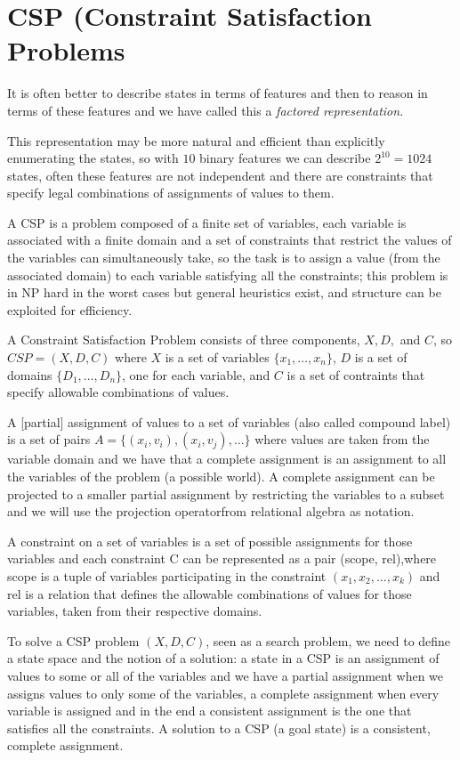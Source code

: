 \chapter{CSP (Constraint Satisfaction Problems}
It is often better to describe states in terms of features and then to reason in terms of these features and we have called this a \emph{factored representation}.

This representation may be more natural and efficient than explicitly enumerating the states, so with $10$ binary features we can describe $2^{10} = 1024$ states,
often these features are not independent and there are constraints that specify legal combinations of assignments of values to them.

A CSP is a problem composed of a finite set of variables, each variable is
associated with a finite domain and a set of constraints that restrict
the values of the variables can simultaneously take, so the task is to
assign a value (from the associated domain) to each variable 
satisfying all the constraints;
this problem is in NP hard in the worst cases but general heuristics exist, and structure can be exploited for efficiency.

A Constraint Satisfaction Problem consists of three components, $X, D,$ and $C$,
so $CSP = (X, D, C)$ where $X$ is a set of variables $\{x_1, \dots, x_n\}$, $D$ is a set of domains $\{D_1, \dots, D_n\}$, one for each variable, and 
$C$ is a set of contraints that specify allowable combinations of values.

A [partial] assignment of values to a set of variables (also called compound
label) is a set of pairs $A = \{(x_i, v_i), (x_i, v_j), \dots\}$
where values are taken from the variable domain and we have that a 
complete assignment is an assignment to all the variables
of the problem (a possible world).\newline
A complete assignment can be projected to a smaller partial assignment
by restricting the variables to a subset and we will use the projection operatorfrom relational algebra as notation.

A constraint on a set of variables is a set of possible assignments for 
those variables and each constraint C can be represented as a pair (scope, rel),where scope is a tuple of variables participating in the constraint 
$(x_1, x_2, \dots, x_k)$ and rel is a relation that defines the allowable 
combinations of values for those variables, taken from their respective domains.

To solve a CSP problem $(X, D, C)$, seen as a search problem, we need to 
define a state space and the notion of a solution:
a state in a CSP is an assignment of values to some or all of the variables and we have a partial assignment when we assigns values to only some of the variables, a complete assignment when every variable is assigned and in the end
a consistent assignment is the one that satisfies all the constraints.\newline
A solution to a CSP (a goal state) is a consistent, complete assignment.

